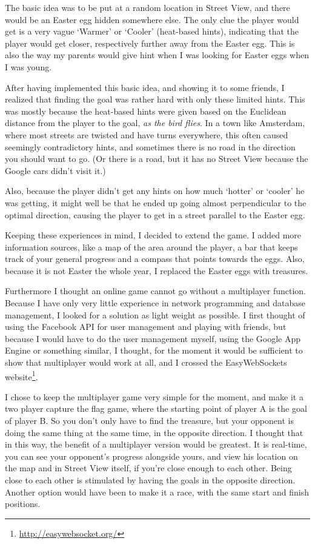 \documentclass[a4paper,10pt]{article}
\begin{document}
The basic idea was to be put at a random location in Street View, and there would be an Easter egg hidden somewhere else. The only clue the player would get is a very vague `Warmer' or `Cooler' (heat-based hints), indicating that the player would get closer, respectively further away from the Easter egg. This is also the way my parents would give hint when I was looking for Easter eggs when I was young.

After having implemented this basic idea, and showing it to some friends, I realized that finding the goal was rather hard with only these limited hints. This was mostly because the heat-based hints were given based on the Euclidean distance from the player to the goal, \emph{as the bird flies}. In a town like Amsterdam, where most streets are twisted and have turns everywhere, this often caused seemingly contradictory hints, and sometimes there is no road in the direction you should want to go. (Or there is a road, but it has no Street View because the Google cars didn't visit it.)

Also, because the player didn't get any hints on how much `hotter' or `cooler' he was getting, it might well be that he ended up going almost perpendicular to the optimal direction, causing the player to get in a street parallel to the Easter egg.

Keeping these experiences in mind, I decided to extend the game. I added more information sources, like a map of the area around the player, a bar that keeps track of your general progress and a compass that points towards the eggs. Also, because it is not Easter the whole year, I replaced the Easter eggs with treasures.

Furthermore I thought an online game cannot go without a multiplayer function. Because I have only very little experience in network programming and database management, I looked for a solution as light weight as possible. I first thought of using the Facebook API for user management and playing with friends, but because I would have to do the user management myself, using the Google App Engine or something similar, I thought, for the moment it would be sufficient to show that multiplayer would work at all, and I crossed the EasyWebSockets website\footnote{\url{http://easywebsocket.org/}}.

I chose to keep the multiplayer game very simple for the moment, and make it a two player capture the flag game, where the starting point of player A is the goal of player B. So you don't only have to find the treasure, but your opponent is doing the same thing at the same time, in the opposite direction. I thought that in this way, the benefit of a multiplayer version would be greatest. It is real-time, you can see your opponent's progress alongside yours, and view his location on the map and in Street View itself, if you're close enough to each other. Being close to each other is stimulated by having the goals in the opposite direction. Another option would have been to make it a race, with the same start and finish positions.
\end{document}
